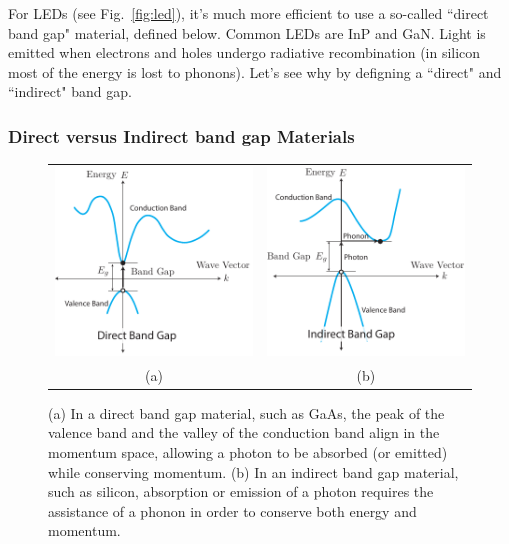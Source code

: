 For LEDs (see Fig.~\ref{fig:led}), it's much more efficient to use a so-called ``direct band gap" material, defined below.  Common LEDs are InP and GaN.  Light is emitted when electrons and holes undergo radiative recombination (in silicon most of the energy is lost to phonons).  Let's see why by defigning a ``direct" and ``indirect" band gap.
\subsubsection*{Direct versus Indirect band gap Materials}
\begin{figure}[tb]
\begin{center}
\begin{tabular}{cc}
\includegraphics[width=.4\columnwidth]{bandgap_direct} & 
\includegraphics[width=.4\columnwidth]{bandgap_indirect}\\
(a) & (b) \\
\end{tabular}
\end{center}
\caption{(a) In a direct band gap material, such as GaAs, the peak of the valence band and the valley of the conduction band align in the momentum space, allowing a photon to be absorbed (or emitted) while conserving momentum.  (b)  In an indirect band gap material, such as silicon, absorption or emission of a photon requires the assistance of a phonon in order to conserve both energy and momentum.  } \label{fig:band gap_direct}
\end{figure}

